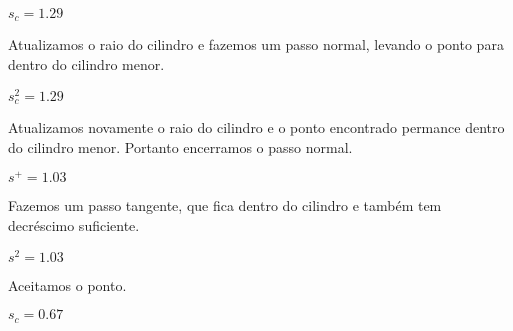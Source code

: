 \begin{center}

  $s_c = 1.29$
\end{center}

\begin{center}
  \begin{minipage}{0.9\textwidth}
    Atualizamos o raio do cilindro e fazemos um passo normal, levando o ponto
    para dentro do cilindro menor.
  \end{minipage}
\end{center}

\begin{center}

  $s_c^2 = 1.29$
\end{center}

\begin{center}
  \begin{minipage}{0.9\textwidth}
    Atualizamos novamente o raio do cilindro e o ponto encontrado permance dentro do
    cilindro menor. Portanto encerramos o passo normal.
  \end{minipage}
\end{center}

\begin{center}

  $s^+ = 1.03$
\end{center}

\begin{center}
  \begin{minipage}{0.9\textwidth}
    Fazemos um passo tangente, que fica dentro do cilindro e também tem
    decréscimo suficiente.
\end{minipage}
\end{center}

\begin{center}

  $s^2 = 1.03$
\end{center}

\begin{center}
  \begin{minipage}{0.9\textwidth}
    Aceitamos o ponto.
  \end{minipage}
\end{center}

\begin{center}

  $s_c = 0.67$
\end{center}

